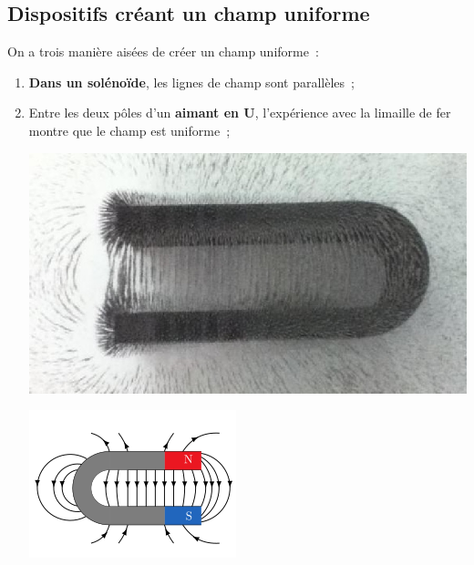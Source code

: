 \documentclass[../../main/main.tex]{subfiles}
\begin{document}
\subsection{Dispositifs créant un champ uniforme}
On a trois manière aisées de créer un champ uniforme~:
\begin{enumerate}
  \item \textbf{Dans un solénoïde}, les lignes de champ sont parallèles~;

  \item Entre les deux pôles d'un \textbf{aimant en U}, l'expérience avec la
    limaille de fer montre que le champ est uniforme~;
	      \smallbreak
        \begin{center}
          \noindent
        \begin{minipage}[c]{.45\linewidth}
          \centering
          \includegraphics[scale=1,rotate=180]{aimu_lim.jpg}
        \end{minipage}
        \hfill
        \begin{minipage}[c]{.45\linewidth}
          \centering
          \includegraphics[scale=1]{aimu_sch}
        \end{minipage}
            \label{fig:aimu}
        \end{center}


\end{enumerate}
\end{document}
